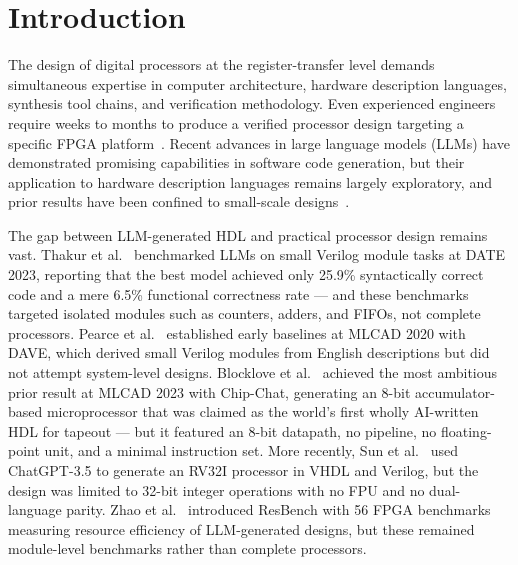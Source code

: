 \documentclass[journal]{IEEEtran}
\begin{document}
\section{Introduction}

The design of digital processors at the register-transfer level demands simultaneous expertise in computer architecture, hardware description languages, synthesis tool chains, and verification methodology. Even experienced engineers require weeks to months to produce a verified processor design targeting a specific FPGA platform~\cite{patterson2017cod}. Recent advances in large language models (LLMs) have demonstrated promising capabilities in software code generation, but their application to hardware description languages remains largely exploratory, and prior results have been confined to small-scale designs~\cite{thakur2023date, blocklove2023chipchat, pearce2020dave, sun2024hdlgen, zhao2025resbench}.

The gap between LLM-generated HDL and practical processor design remains vast. Thakur et al.~\cite{thakur2023date} benchmarked LLMs on small Verilog module tasks at DATE 2023, reporting that the best model achieved only 25.9\% syntactically correct code and a mere 6.5\% functional correctness rate --- and these benchmarks targeted isolated modules such as counters, adders, and FIFOs, not complete processors. Pearce et al.~\cite{pearce2020dave} established early baselines at MLCAD 2020 with DAVE, which derived small Verilog modules from English descriptions but did not attempt system-level designs. Blocklove et al.~\cite{blocklove2023chipchat} achieved the most ambitious prior result at MLCAD 2023 with Chip-Chat, generating an 8-bit accumulator-based microprocessor that was claimed as the world's first wholly AI-written HDL for tapeout --- but it featured an 8-bit datapath, no pipeline, no floating-point unit, and a minimal instruction set. More recently, Sun et al.~\cite{sun2024hdlgen} used ChatGPT-3.5 to generate an RV32I processor in VHDL and Verilog, but the design was limited to 32-bit integer operations with no FPU and no dual-language parity. Zhao et al.~\cite{zhao2025resbench} introduced ResBench with 56 FPGA benchmarks measuring resource efficiency of LLM-generated designs, but these remained module-level benchmarks rather than complete processors.
\end{document}
